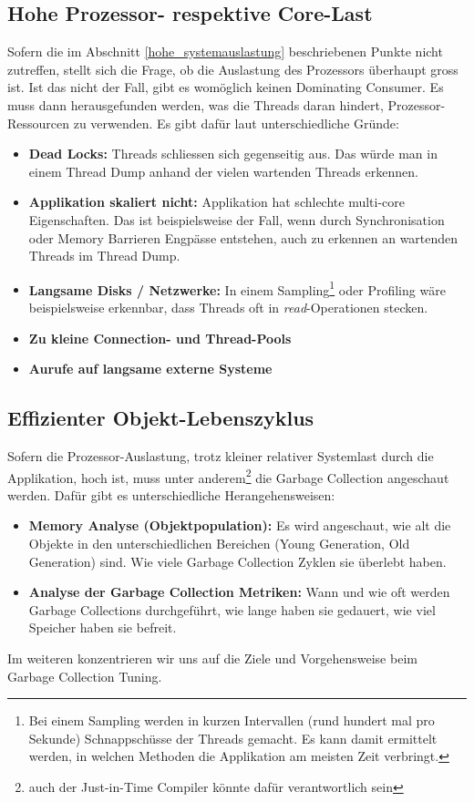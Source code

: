 \subsection{Hohe Prozessor- respektive Core-Last}
Sofern die im Abschnitt \ref{hohe_systemauslastung} beschriebenen Punkte nicht zutreffen, stellt sich die Frage, ob die Auslastung des Prozessors überhaupt gross ist. Ist das nicht der Fall, gibt es womöglich keinen Dominating Consumer. Es muss dann herausgefunden werden, was die Threads daran hindert, Prozessor-Ressourcen zu verwenden. Es gibt dafür laut \cite{pepperdine201102} unterschiedliche Gründe:
\begin{itemize}
\item \textbf{Dead Locks: } Threads schliessen sich gegenseitig aus. Das würde man in einem Thread Dump anhand der vielen wartenden Threads erkennen. 
\item \textbf{Applikation skaliert nicht: } Applikation hat schlechte multi-core Eigenschaften. Das ist beispielsweise der Fall, wenn durch Synchronisation oder Memory Barrieren Engpässe entstehen, auch zu erkennen an wartenden Threads im Thread Dump.
\item \textbf{Langsame Disks / Netzwerke: }In einem Sampling\footnote{Bei einem Sampling werden in kurzen Intervallen (rund hundert mal pro Sekunde) Schnappschüsse der Threads gemacht. Es kann damit ermittelt werden, in welchen Methoden die Applikation am meisten Zeit verbringt.} oder Profiling wäre beispielsweise erkennbar, dass Threads oft in \textit{read}-Operationen stecken.
\item \textbf{Zu kleine Connection- und Thread-Pools}
\item \textbf{Aurufe auf langsame externe Systeme}
\end{itemize}


\subsection{Effizienter Objekt-Lebenszyklus}
Sofern die Prozessor-Auslastung, trotz kleiner relativer Systemlast durch die Applikation, hoch ist, muss unter anderem\footnote{auch der Just-in-Time Compiler könnte dafür verantwortlich sein} die Garbage Collection angeschaut werden. Dafür gibt es unterschiedliche Herangehensweisen:
\begin{itemize}
\item \textbf{Memory Analyse (Objektpopulation): }Es wird angeschaut, wie alt die Objekte in den unterschiedlichen Bereichen (Young Generation, Old Generation) sind. Wie viele Garbage Collection Zyklen sie überlebt haben.
\item \textbf{Analyse der Garbage Collection Metriken: }Wann und wie oft werden Garbage Collections durchgeführt, wie lange haben sie gedauert, wie viel Speicher haben sie befreit.
\end{itemize}
Im weiteren konzentrieren wir uns auf die Ziele und Vorgehensweise beim Garbage Collection Tuning.

